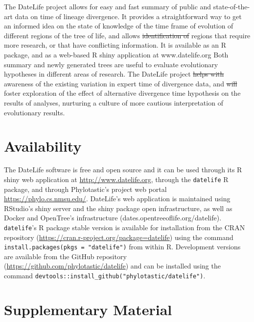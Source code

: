 \documentclass[english,man]{apa6}
\providecommand{\DIFaddtex}[1]{{\protect\color{blue}\uwave{#1}}} %
\providecommand{\DIFdeltex}[1]{{\protect\color{red}\sout{#1}}}                      %
\providecommand{\DIFaddbegin}{} %
\providecommand{\DIFaddend}{} %
\providecommand{\DIFdelbegin}{} %
\providecommand{\DIFdelend}{} %
\providecommand{\DIFadd}[1]{\texorpdfstring{\DIFaddtex{#1}}{#1}} %
\providecommand{\DIFdel}[1]{\texorpdfstring{\DIFdeltex{#1}}{}} %
\newcommand{\DIFscaledelfig}{0.5}
\newlength{\DIFdelgraphicswidth} %
\newlength{\DIFdelgraphicsheight} %
\newcommand{\DIFaddincludegraphics}[2][]{{\color{blue}\fbox{\DIFOincludegraphics[#1]{#2}}}} %
\newcommand{\DIFdelincludegraphics}[2][]{%
\sbox{\DIFdelgraphicsbox}{\DIFOincludegraphics[#1]{#2}}%
\settoboxwidth{\DIFdelgraphicswidth}{\DIFdelgraphicsbox} %
\settoboxtotalheight{\DIFdelgraphicsheight}{\DIFdelgraphicsbox} %
\scalebox{\DIFscaledelfig}{%
\parbox[b]{\DIFdelgraphicswidth}{\usebox{\DIFdelgraphicsbox}\\[-\baselineskip] \rule{\DIFdelgraphicswidth}{0em}}\llap{\resizebox{\DIFdelgraphicswidth}{\DIFdelgraphicsheight}{%
\setlength{\unitlength}{\DIFdelgraphicswidth}%
\begin{picture}(1,1)%
\thicklines\linethickness{2pt} %
{\color[rgb]{1,0,0}\put(0,0){\framebox(1,1){}}}%
{\color[rgb]{1,0,0}\put(0,0){\line( 1,1){1}}}%
{\color[rgb]{1,0,0}\put(0,1){\line(1,-1){1}}}%
\end{picture}%
}\hspace*{3pt}}} %
} %
\DeclareRobustCommand{\DIFaddbegin}{\DIFOaddbegin \let\includegraphics\DIFaddincludegraphics} %
\DeclareRobustCommand{\DIFaddend}{\DIFOaddend \let\includegraphics\DIFOincludegraphics} %
\DeclareRobustCommand{\DIFdelbegin}{\DIFOdelbegin \let\includegraphics\DIFdelincludegraphics} %
\DeclareRobustCommand{\DIFdelend}{\DIFOaddend \let\includegraphics\DIFOincludegraphics} %
\begin{document}
The DateLife project allows for easy and fast summary of public and state-of-the-art data on time of lineage divergence.
It provides a straightforward way to get an informed idea on the state of knowledge of the time frame of evolution of different regions of the tree of life, and allows \DIFdelbegin \DIFdel{identification of }\DIFdelend \DIFaddbegin \DIFadd{identifying }\DIFaddend regions that require more research, or that have conflicting information.
It is available as an R package, and as a web-based R shiny application at www.datelife.org
Both summary and newly generated trees are useful to evaluate evolutionary hypotheses in different areas of research. The DateLife project \DIFdelbegin \DIFdel{helps with }\DIFdelend \DIFaddbegin \DIFadd{should improve }\DIFaddend awareness of the existing variation in expert time of divergence data, and \DIFdelbegin \DIFdel{will }\DIFdelend foster exploration of the effect of alternative divergence time hypothesis on the results of analyses, nurturing a culture of more cautious interpretation of evolutionary results.

\hypertarget{availability}{%
\section{Availability}\label{availability}}

The DateLife software is free and open source and it can be used through its R shiny web application at \url{http://www.datelife.org}, through the \texttt{datelife} R package, and through Phylotastic's project web portal \url{https://phylo.cs.nmsu.edu/}.
DateLife's web application is maintained using RStudio's shiny server and the shiny package open infrastructure, as well as Docker and OpenTree's infrastructure (dates.opentreeoflife.org/datelife).
\texttt{datelife}'s R package stable version is available for installation from the CRAN repository (\url{https://cran.r-project.org/package=datelife}) using the command \texttt{install.packages(pkgs\ =\ "datelife")} from within R.
Development versions are available from the GitHub repository (\url{https://github.com/phylotastic/datelife}) and can be installed using the command \texttt{devtools::install\_github("phylotastic/datelife")}.

\hypertarget{supplementary-material}{%
\section{Supplementary Material}\label{supplementary-material}}
\end{document}
